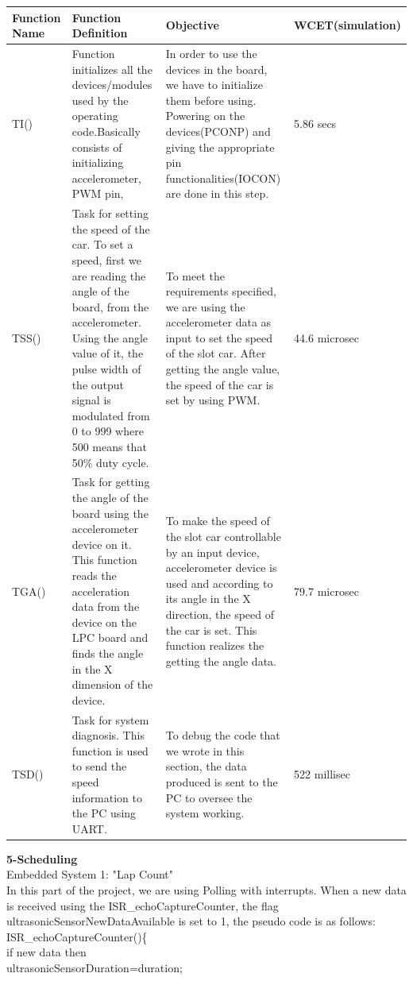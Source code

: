 \documentclass{article}
\begin{document}
\begin{tabular}{| C{4cm} | C{4cm} | C{4cm} | C{2cm} |}
\hline
\textbf{Function Name} &\textbf{Function Definition}  & \textbf{Objective} &\textbf{WCET}\linebreak(simulation)\\
\hline
TI()&Function initializes all the devices/modules used by the operating code.Basically consists of initializing
accelerometer, PWM pin, &In order to use the devices in the board, we have to initialize them before using.
Powering on the devices(PCONP) and giving the appropriate pin functionalities(IOCON) are done in this step.&5.86 secs\\
\hline
TSS()&Task for setting the speed of the car. To set a speed, first we are reading the angle of the board, from the
accelerometer. Using the angle value of it, the pulse width of the output signal is modulated from 0 to 999 where 500
means that 50\% duty cycle.& To meet the requirements specified, we are using the accelerometer data as input to
set the speed of the slot car. After getting the angle value, the speed of the car is set by using PWM.&44.6 microsec\\
\hline
TGA()&Task for getting the angle of the board using the accelerometer device on it. This function reads the
acceleration data from the device on the LPC board and finds the angle in the X dimension of the device.&
To make the speed of the slot car controllable by an input device, accelerometer device is used and according to
its angle in the X direction, the speed of the car is set. This function realizes the getting the angle data.&79.7 microsec\\
\hline
TSD()&Task for system diagnosis. This function is used to send the speed information to the PC using UART.&To debug the
code that we wrote in this section, the data produced is sent to the PC to oversee the system working.&522 millisec\\
\hline
\end{tabular}
\clearpage
{\huge\textbf {5-Scheduling}}
\\
{\huge {Embedded System 1: "Lap Count"}}
\\
In this part of the project, we are using Polling with interrupts. When a new data
is received using the ISR\_echoCaptureCounter, the flag ultrasonicSensorNewDataAvailable is
set to 1, the pseudo code is as follows:\\
ISR\_echoCaptureCounter()\{\\ if new data then\\ ultrasonicSensorDuration=duration;
\end{document}
